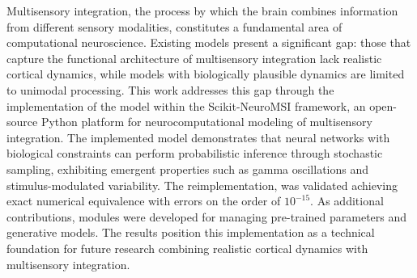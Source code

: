 Multisensory integration, the process by which the brain combines information from different sensory modalities, constitutes a fundamental area of computational neuroscience. Existing models present a significant gap: those that capture the functional architecture of multisensory integration lack realistic cortical dynamics, while models with biologically plausible dynamics are limited to unimodal processing. This work addresses this gap through the implementation of the \citet{echeveste2020cortical} model within the Scikit-NeuroMSI framework, an open-source Python platform for neurocomputational modeling of multisensory integration. The implemented model demonstrates that neural networks with biological constraints can perform probabilistic inference through stochastic sampling, exhibiting emergent properties such as gamma oscillations and stimulus-modulated variability. The reimplementation, was validated achieving exact numerical equivalence with errors on the order of $10^{-15}$. As additional contributions, modules were developed for managing pre-trained parameters and generative models. The results position this implementation as a technical foundation for future research combining realistic cortical dynamics with multisensory integration.